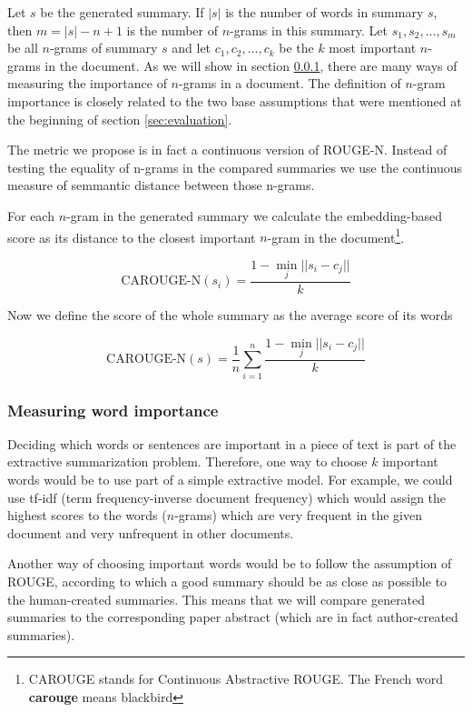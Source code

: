 \documentclass[sigplan]{acmart}
\begin{document}
Let $s$ be the generated summary. If $|s|$ is the number of words in summary $s$, then $m=|s|-n+1$ is the number of $n$-grams in this summary. Let $s_1, s_2, \dots, s_m$ be all $n$-grams of summary $s$ and let $c_1, c_2, \dots, c_k$ be the $k$ most important $n$-grams in the document. As we will show in section \ref{sec:importance}, there are many ways of measuring the importance of $n$-grams in a document. The definition of $n$-gram importance is closely related to the two base assumptions that were mentioned at the beginning of section \ref{sec:evaluation}.

The metric we propose is in fact a continuous version of ROUGE-N. Instead of testing the equality of n-grams in the compared summaries we use the continuous measure of semmantic distance between those n-grams.

For each $n$-gram in the generated summary we calculate the embedding-based score as its distance to the closest important $n$-gram in the document\footnote{CAROUGE stands for Continuous Abstractive ROUGE. The French word \textbf{carouge} means blackbird}.

\[ \text{CAROUGE-N}(s_i) = \frac{1 - \operatorname*{min}_j ||s_i - c_j||}{k} \]

Now we define the score of the whole summary as the average score of its words

\[ \text{CAROUGE-N}(s) = \frac1n \sum_{i=1}^n \frac{1 - \operatorname*{min}_j ||s_i - c_j||}{k} \]

\subsubsection{Measuring word importance}
\label{sec:importance}

Deciding which words or sentences are important in a piece of text is part of the extractive summarization problem. Therefore, one way to choose $k$ important words would be to use part of a simple extractive model. For example, we could use tf-idf (term frequency-inverse document frequency) which would assign the highest scores to the words ($n$-grams) which are very frequent in the given document and very unfrequent in other documents.

Another way of choosing important words would be to follow the assumption of ROUGE, according to which a good summary should be as close as possible to the human-created summaries. This means that we will compare generated summaries to the corresponding paper abstract (which are in fact author-created summaries).
\end{document}
